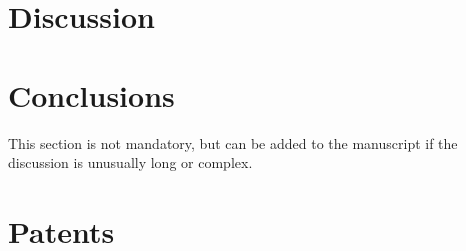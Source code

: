 \documentclass[journal,article,submit,pdftex,moreauthors]{Definitions/mdpi}
\begin{document}
\section{Discussion}



\section{Conclusions}

This section is not mandatory, but can be added to the manuscript if the discussion is unusually long or complex.

\section{Patents}

\vspace{6pt} 




\end{document}
